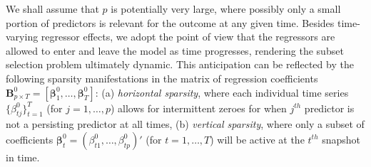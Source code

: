 \documentclass[ba]{imsart}
\numberwithin{equation}{section}
\theoremstyle{plain}
\def\B{\mbox{\boldmath$B$}}
\def\b{\mbox{\boldmath$b$}}
\def\B{\mbox{\boldmath$B$}}
\newcommand{\bm}[1]{\boldsymbol{#1}}
\def\B{\bm{B}}
\def\b{\bm{\beta}}
\begin{document}
We shall assume that $p$ is potentially very large, where possibly only a small portion of predictors is relevant for the outcome at any given time. 
{Besides  time-varying regressor effects,} we  adopt the point of view that the regressors are allowed to enter and leave the model as time progresses, rendering the subset selection problem ultimately dynamic. This anticipation can be reflected by the following sparsity manifestations in the matrix of regression coefficients $\B^0_{p\times T}=[\b^0_1,\dots,\b^0_T]$: (a) {\sl horizontal sparsity}, where each individual time series $\{\beta_{tj}^0\}_{t=1}^T$ (for $j=1,\dots,p$) allows for intermittent zeroes for when $j^{th}$ predictor is not a persisting predictor at all times, (b) {\sl vertical sparsity}, where only a subset of coefficients  $\b_t^0=(\beta_{t1}^0,\dots,\beta_{tp}^0)'$ (for $t=1,\dots,T$)  will be active at the $t^{th}$ snapshot in time.

\end{document}
